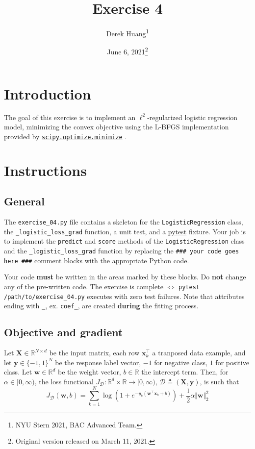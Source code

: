 \documentclass{article}
\title{Exercise 4}
\author{Derek Huang\thanks{NYU Stern 2021, BAC Advanced Team.}}
\date{June 6, 2021\thanks{Original version released on March 11, 2021.}}
\numberwithin{equation}{section}
\newcommand{\pytest}{\href{https://docs.pytest.org/en/stable/}{pytest}}
\newcommand{\minimize}{%
    \href{%
        https://docs.scipy.org/doc/scipy/reference/generated/%
        scipy.optimize.minimize.html%
    }{\texttt{scipy.optimize.minimize}}%
}
\newcommand{\loglossgrad}{\texttt{\_logistic\_loss\_grad}}
\begin{document}
\maketitle
\thispagestyle{fancy}


\section{Introduction}

The goal of this exercise is to implement an $ \ell^2 $-regularized logistic
regression model, minimizing the convex objective using the L-BFGS
implementation provided by \minimize.

\section{Instructions}

\subsection{General}

The \texttt{exercise\_04.py} file contains a skeleton for the
\texttt{LogisticRegression} class, the \loglossgrad{} function, a unit test,
and a \pytest{} fixture. Your job is to implement the \texttt{predict} and
\texttt{score} methods of the \texttt{LogisticRegression} class and the
\loglossgrad{} function by replacing the
\texttt{\#\#\# your code goes here \#\#\#} comment blocks with the appropriate
Python code.

\medskip

Your code \textbf{must} be written in the areas marked by these blocks. Do
\textbf{not} change any of the pre-written code. The exercise is complete
$ \Leftrightarrow $ \texttt{pytest /path/to/exercise\_04.py} executes with
zero test failures. Note that attributes ending with \texttt{\_}, ex.
\texttt{coef\_}, are created \textbf{during} the fitting process.

\subsection{Objective and gradient}

Let $ \mathbf{X} \in \mathbb{R}^{N \times d} $ be the input matrix, each row
$ \mathbf{x}_k^\top $ a tranposed data example, and let $ \mathbf{y} \in
\{-1, 1\}^N $ be the response label vector, $ -1 $ for negative class, $ 1 $
for positive class. Let $ \mathbf{w} \in \mathbb{R}^d $ be the weight vector,
$ b \in \mathbb{R} $ the intercept term. Then, for $ \alpha \in [0, \infty) $,
the loss functional $ J_\mathcal{D} : \mathbb{R}^d \times \mathbb{R}
\rightarrow [0, \infty) $, $ \mathcal{D} \triangleq
(\mathbf{X}, \mathbf{y}) $, is such that
\begin{equation} \label{logreg_obj}
    J_\mathcal{D}(\mathbf{w}, b) = \sum_{k = 1}^N\log\left(
        1 + e^{-y_k(\mathbf{w}^\top\mathbf{x}_k + b)}
    \right) + \frac{1}{2}\alpha\Vert\mathbf{w}\Vert_2^2
\end{equation}
\end{document}

